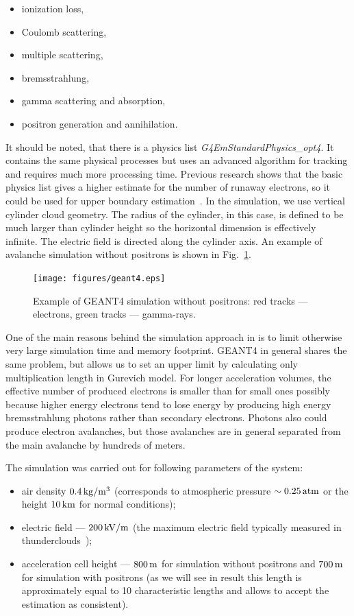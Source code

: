 \documentclass[doublecol,linenumbers]{epl2} %
\begin{document}
    \begin{itemize}
        \item ionization loss,
        \item Coulomb scattering,
        \item multiple scattering,
        \item bremsstrahlung,
        \item gamma scattering and absorption,
        \item positron generation and annihilation.
    \end{itemize}
    It should be noted, that there is a physics list \textit{G4EmStandardPhysics\_opt4}. It contains the same physical processes but uses an advanced algorithm for tracking and requires much more processing time. Previous research shows that the basic physics list gives a higher estimate for the number of runaway electrons, so it could be used for upper boundary estimation~\cite{npmdwyer}.
    In the simulation, we use vertical cylinder cloud geometry. The radius of the cylinder, in this case, is defined to be much larger than cylinder height so the horizontal dimension is effectively infinite. The electric field is directed along the cylinder axis. An example of avalanche simulation without positrons is shown in Fig.~\ref{fig:geant4}.
    \begin{figure}[h]
        \centering
        \texttt{[image: figures/geant4.eps]}
        \caption{Example of GEANT4 simulation without positrons: red tracks --- electrons, green tracks --- gamma-rays.}
        \label{fig:geant4}
    \end{figure}
    One of the main reasons behind the simulation approach in \cite{Oreshkin_2018} is to limit otherwise very large simulation time and memory footprint. GEANT4 in general shares the same problem, but allows us to set an upper limit by calculating only multiplication length in Gurevich model. For longer acceleration volumes, the effective number of produced electrons is smaller than for small ones possibly because higher energy electrons tend to lose energy by producing high energy bremsstrahlung photons rather than secondary electrons. Photons also could produce electron avalanches, but those avalanches are in general separated from the main avalanche by hundreds of meters.
    
    The simulation was carried out for following parameters of the system:
    \begin{itemize}
        \item air density $0.4\un{kg/m^3}$ (corresponds to atmospheric pressure $\sim 0.25\un{atm}$ or the height $10\un{km}$ for normal conditions);
        \item electric field --- $200\un{kV/m}$ (the maximum electric field typically measured in thunderclouds~\cite{rakov_uman});
        \item acceleration cell height --- $800\un{m}$ for simulation without positrons and $700\un{m}$ for simulation with positrons (as we will see in result this length is approximately equal to 10 characteristic lengths and allows to accept the estimation as consistent).
    \end{itemize}
    
\end{document}
